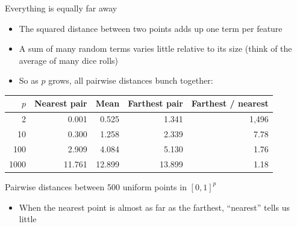 \begin{frame}{Everything is equally far away}
    \begin{itemize}
        \item The squared distance between two points adds up one term per feature
        \item A sum of many random terms varies little relative to its size (think of the average of many dice rolls)
        \item So as $p$ grows, all pairwise distances bunch together:
    \end{itemize}
    \centering
    \footnotesize
    \begin{tabular}{@{}r r r r r@{}}
        \toprule
        $p$ & Nearest pair & Mean & Farthest pair & Farthest / nearest \\
        \midrule
        2 & 0.001 & 0.525 & 1.341 & 1{,}496 \\
        10 & 0.300 & 1.258 & 2.339 & 7.78 \\
        100 & 2.909 & 4.084 & 5.130 & 1.76 \\
        1000 & 11.761 & 12.899 & 13.899 & 1.18 \\
        \bottomrule
    \end{tabular}

    {\scriptsize Pairwise distances between 500 uniform points in $[0, 1]^p$\par}
    \normalsize
    \raggedright
    \begin{itemize}
        \item When the nearest point is almost as far as the farthest, ``nearest'' tells us little
    \end{itemize}
\end{frame}

